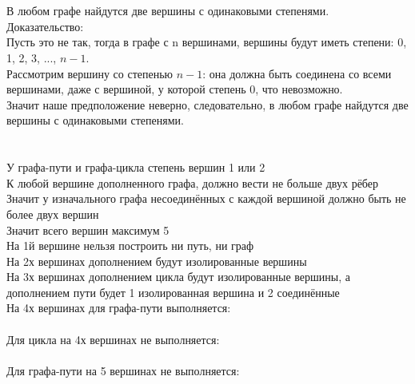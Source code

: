 \documentclass{article}
\begin{document}
\section{}
В любом графе найдутся две вершины с одинаковыми степенями.\\
Доказательство:
\\
Пусть это не так, тогда в графе с n вершинами, вершины будут иметь степени:
0, 1, 2, 3, ..., $n-1$.\\
Рассмотрим вершину со степенью $n-1$: она должна быть соединена со всеми вершинами, даже с вершиной, у которой степень 0, что невозможно.\\ Значит наше предположение неверно, следовательно, в любом графе найдутся две вершины с одинаковыми степенями.
\section{}
У графа-пути и графа-цикла степень вершин 1 или 2\\
К любой вершине дополненного графа, должно вести не больше двух рёбер\\
Значит у изначального графа несоединённых с каждой вершиной должно быть не более двух вершин\\
Значит всего вершин максимум 5\\
На 1й вершине нельзя построить ни путь, ни граф\\
На 2х вершинах дополнением будут изолированные вершины\\
На 3х вершинах дополнением цикла будут изолированные вершины, а дополнением пути будет 1 изолированная вершина и 2 соединённые\\
На 4х вершинах для графа-пути выполняется:\\
\\
Для цикла на 4х вершинах не выполняется:\\
\\
Для графа-пути на 5 вершинах не выполняется:\\
\\
\end{document}
